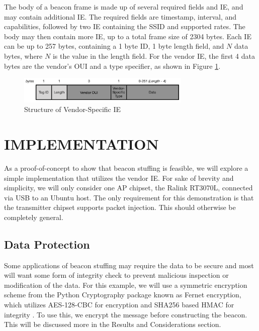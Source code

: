 \documentclass[letterpaper, 10 pt, conference]{ieeeconf}  %
\begin{document}
The body of a beacon frame is made up of several required fields and IE, and may contain additional IE.  The required fields are timestamp, interval, and capabilities, followed by two IE containing the SSID and supported rates. The body may then contain more IE, up to a total frame size of 2304 bytes. Each IE can be up to 257 bytes, containing a 1 byte ID, 1 byte length field, and $N$ data bytes, where $N$ is the value in the length field.  For the vendor IE, the first 4 data bytes are the vendor's OUI and a type specifier, as shown in Figure \ref{fig:vendorIE}.

\begin{figure}[h!]
	\includegraphics[width=3.25in]{vendorIE.png}
    \caption{Structure of Vendor-Specific IE}
    \label{fig:vendorIE}
\end{figure}


\section{IMPLEMENTATION}

As a proof-of-concept to show that beacon stuffing is feasible, we will explore a simple implementation that utilizes the vendor IE.  For sake of brevity and simplicity, we will only consider one AP chipset, the Ralink RT3070L, connected via USB to an Ubuntu host.  The only requirement for this demonstration is that the transmitter chipset supports packet injection.  This should otherwise be completely general.

\subsection{Data Protection}

Some applications of beacon stuffing may require the data to be secure and most will want some form of integrity check to prevent malicious inspection or modification of the data.  For this example, we will use a symmetric encryption scheme from the Python Cryptography package known as Fernet encryption, which utilizes AES-128-CBC for encryption and SHA256 based HMAC for integrity \cite{c5}.  To use this, we encrypt the message before constructing the beacon. This will be discussed more in the Results and Considerations section.
\end{document}
